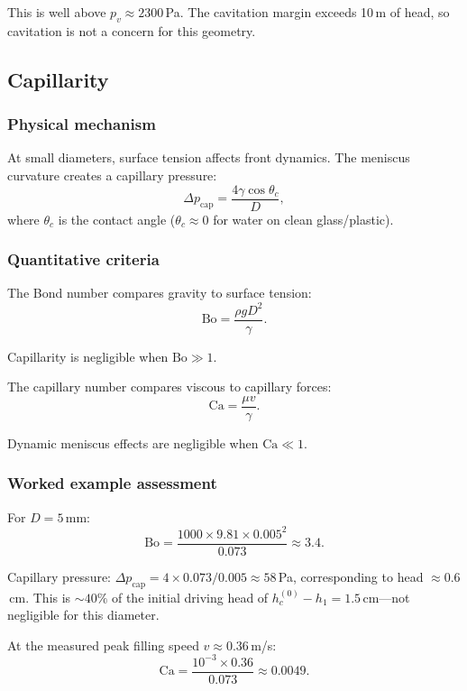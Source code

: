 \documentclass[11pt]{article}
\begin{document}
This is well above $p_v \approx 2300$\,Pa. The cavitation margin exceeds 10\,m of head, so cavitation is not a concern for this geometry.

\subsection{Capillarity}

\subsubsection{Physical mechanism}

At small diameters, surface tension affects front dynamics. The meniscus curvature creates a capillary pressure:
\[
  \Delta p_{\text{cap}} = \frac{4\gamma\cos\theta_c}{D},
\]
where $\theta_c$ is the contact angle ($\theta_c \approx 0$ for water on clean glass/plastic).

\subsubsection{Quantitative criteria}

The Bond number compares gravity to surface tension:
\begin{equation}
  \text{Bo} = \frac{\rho g D^2}{\gamma}.
  \label{eq:bond}
\end{equation}

Capillarity is negligible when $\text{Bo} \gg 1$.

The capillary number compares viscous to capillary forces:
\begin{equation}
  \text{Ca} = \frac{\mu v}{\gamma}.
  \label{eq:capillary}
\end{equation}

Dynamic meniscus effects are negligible when $\text{Ca} \ll 1$.

\subsubsection{Worked example assessment}

For $D = 5$\,mm:
\[
  \text{Bo} = \frac{1000 \times 9.81 \times 0.005^2}{0.073} \approx 3.4.
\]

Capillary pressure: $\Delta p_{\text{cap}} = 4 \times 0.073/0.005 \approx 58$\,Pa, corresponding to head $\approx 0.6$\,cm. This is $\sim 40\%$ of the initial driving head of $h_c^{(0)} - h_1 = 1.5$\,cm---not negligible for this diameter.

At the measured peak filling speed $v \approx 0.36$\,m/s:
\[
  \text{Ca} = \frac{10^{-3} \times 0.36}{0.073} \approx 0.0049.
\]
\end{document}
